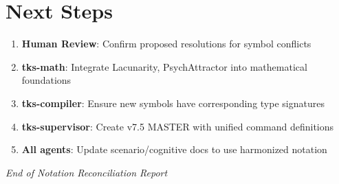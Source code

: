 \documentclass[11pt]{article}
\begin{document}
\section{Next Steps}

\begin{enumerate}
    \item \textbf{Human Review}: Confirm proposed resolutions for symbol conflicts
    \item \textbf{tks-math}: Integrate Lacunarity, PsychAttractor into mathematical foundations
    \item \textbf{tks-compiler}: Ensure new symbols have corresponding type signatures
    \item \textbf{tks-supervisor}: Create v7.5 MASTER with unified command definitions
    \item \textbf{All agents}: Update scenario/cognitive docs to use harmonized notation
\end{enumerate}

\vspace{1cm}
\begin{center}
\textit{End of Notation Reconciliation Report}
\end{center}
\end{document}
